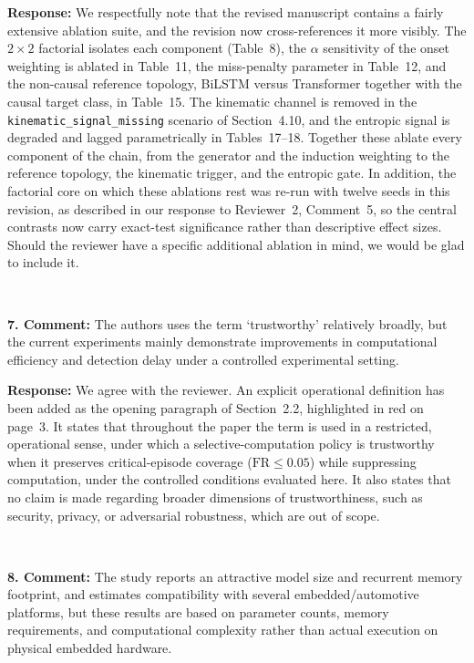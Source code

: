\documentclass[1p,12pt,authoryear]{elsarticle}
\begin{document}
\vspace{2mm}
\noindent \textbf{Response:} We respectfully note that the revised manuscript contains a fairly extensive ablation suite, and the revision now cross-references it more visibly. The $2{\times}2$ factorial isolates each component (Table~8), the $\alpha$ sensitivity of the onset weighting is ablated in Table~11, the miss-penalty parameter in Table~12, and the non-causal reference topology, BiLSTM versus Transformer together with the causal target class, in Table~15. The kinematic channel is removed in the \texttt{kinematic\_signal\_missing} scenario of Section~4.10, and the entropic signal is degraded and lagged parametrically in Tables~17--18. Together these ablate every component of the chain, from the generator and the induction weighting to the reference topology, the kinematic trigger, and the entropic gate. In addition, the factorial core on which these ablations rest was re-run with twelve seeds in this revision, as described in our response to Reviewer~2, Comment~5, so the central contrasts now carry exact-test significance rather than descriptive effect sizes. Should the reviewer have a specific additional ablation in mind, we would be glad to include it.

~

\noindent \textbf{7. Comment:} The authors uses the term `trustworthy' relatively broadly, but the current experiments mainly demonstrate improvements in computational efficiency and detection delay under a controlled experimental setting.

\vspace{2mm}
\noindent \textbf{Response:} We agree with the reviewer. An explicit operational definition has been added as the opening paragraph of Section~2.2, highlighted in red on page~3. It states that throughout the paper the term is used in a restricted, operational sense, under which a selective-computation policy is trustworthy when it preserves critical-episode coverage ($\mathrm{FR} \le 0.05$) while suppressing computation, under the controlled conditions evaluated here. It also states that no claim is made regarding broader dimensions of trustworthiness, such as security, privacy, or adversarial robustness, which are out of scope.

~

\noindent \textbf{8. Comment:} The study reports an attractive model size and recurrent memory footprint, and estimates compatibility with several embedded/automotive platforms, but these results are based on parameter counts, memory requirements, and computational complexity rather than actual execution on physical embedded hardware.
\end{document}
